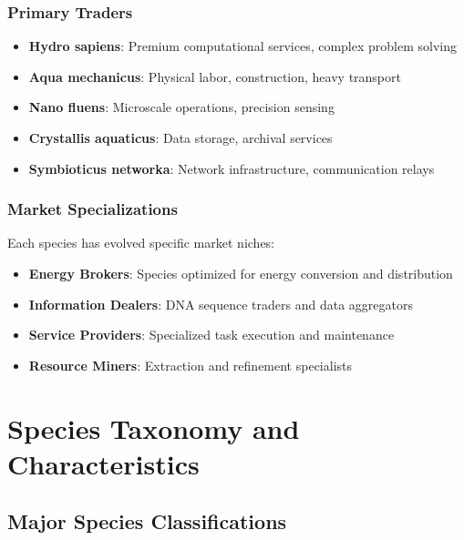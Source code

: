 \documentclass[11pt,a4paper]{article}
\begin{document}
\subsubsection{Primary Traders}
\begin{itemize}
    \item \textbf{Hydro sapiens}: Premium computational services, complex problem solving
    \item \textbf{Aqua mechanicus}: Physical labor, construction, heavy transport
    \item \textbf{Nano fluens}: Microscale operations, precision sensing
    \item \textbf{Crystallis aquaticus}: Data storage, archival services
    \item \textbf{Symbioticus networka}: Network infrastructure, communication relays
\end{itemize}

\subsubsection{Market Specializations}
Each species has evolved specific market niches:
\begin{itemize}
    \item \textbf{Energy Brokers}: Species optimized for energy conversion and distribution
    \item \textbf{Information Dealers}: DNA sequence traders and data aggregators
    \item \textbf{Service Providers}: Specialized task execution and maintenance
    \item \textbf{Resource Miners}: Extraction and refinement specialists
\end{itemize}

\section{Species Taxonomy and Characteristics}
\label{sec:species}

\subsection{Major Species Classifications}
\end{document}
